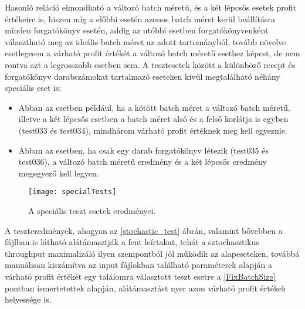 Hasonló reláció elmondható a változó batch méretű, és a két lépcsős esetek profit értékeire is, hiszen míg a előbbi esetén azonos batch méret kerül beállításra minden forgatókönyv esetén, addig az utóbbi esetben forgatókönyvenként választható meg az ideális batch méret az adott tartományból, tovább növelve esetlegesen a várható profit értékét a változó batch méretű esethez képest, de nem rontva azt a legrosszabb esetben sem.
A tesztesetek között a különböző recept és forgatókönyv darabszámokat tartalmazó eseteken kívül megtalálható néhány speciális eset is:
\begin{itemize}
\item Abban az esetben például, ha a kötött batch méret a változó batch méretű, illetve a két lépcsős esetben a batch méret alsó és a felső korlátja is egyben (test033 és test034), mindhárom várható profit értéknek meg kell egyeznie.
\item Abban az esetben, ha csak egy darab forgatókönyv létezik (test035 és test036), a változó batch méretű eredmény és a két lépcsős eredmény megegyező kell legyen.
\end{itemize}
\begin{figure}[hbtp]
\begin{center}
\texttt{[image: specialTests]}
\caption{A speciális teszt esetek eredményei.}
\label{special_tests}
\end{center}
\end{figure} 
A teszteredmények, ahogyan az \ref{stochastic_test} ábrán, valamint bővebben a  fájlban is látható alátámasztják a fent leírtakat, tehát a sztochasztikus throughput maximalizáló ilyen szempontból jól működik az alapeseteken, továbbá manuálisan kiszámítva az input fájlokban található paraméterek alapján a várható profit értékét egy találomra választott teszt esetre a \ref{FixBatchSize} pontban ismertetettek alapján, alátámasztást nyer azon várható profit értékek helyessége is.
\pagebreak
